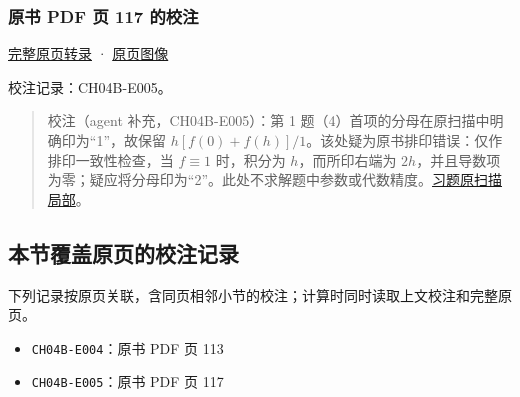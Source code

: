 \documentclass[
  10pt,
  fontset=fandol]{ctexart}
\providecommand{\tightlist}{%
  \setlength{\itemsep}{0pt}\setlength{\parskip}{0pt}}
\begin{document}
\subsubsection{原书 PDF 页 117 的校注}\label{ux539fux4e66-pdf-ux9875-117-ux7684ux6821ux6ce8}

\href{../pages/pdf-117.md}{完整原页转录} · \href{../../source-images/pdf-117.jpeg}{原页图像}

校注记录：CH04B-E005。

\begin{quote}
校注（agent 补充，CH04B-E005）：第 1 题（4）首项的分母在原扫描中明确印为``1''，故保留 \(h[f(0)+f(h)]/1\)。该处疑为原书排印错误：仅作排印一致性检查，当 \(f\equiv1\) 时，积分为 \(h\)，而所印右端为 \(2h\)，并且导数项为零；疑应将分母印为``2''。此处不求解题中参数或代数精度。\href{../assets/ch04b/review-p117-exercises.png}{习题原扫描局部}。
\end{quote}

\subsection{本节覆盖原页的校注记录}\label{ux672cux8282ux8986ux76d6ux539fux9875ux7684ux6821ux6ce8ux8bb0ux5f55}

下列记录按原页关联，含同页相邻小节的校注；计算时同时读取上文校注和完整原页。

\begin{itemize}
\tightlist
\item
  \texttt{CH04B-E004}：原书 PDF 页 113
\item
  \texttt{CH04B-E005}：原书 PDF 页 117
\end{itemize}
\end{document}
